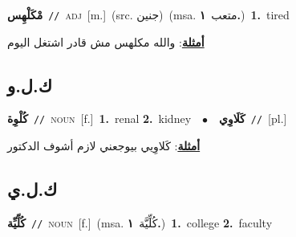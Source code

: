 \documentclass[10pt,a4paper,twoside]{article} %
\begin{document}
\begin{multicols}{2}
{\setlength\topsep{0pt}\textbf{\foreignlanguage{arabic}{مْكَلْهِس}}\ {\color{gray}\texttt{//}\color{black}}\ \textsc{adj}\ [m.]\ (src. \color{gray}\foreignlanguage{arabic}{جنين}\color{black})\ \color{gray}(msa. \foreignlanguage{arabic}{متعب}~\foreignlanguage{arabic}{\textbf{١.}})\color{black}\ \textbf{1.}~tired\  \begin{flushright}\color{gray}\foreignlanguage{arabic}{\textbf{\underline{\foreignlanguage{arabic}{أمثلة}}}: والله مكلهس مش قادر اشتغل اليوم}\end{flushright}\color{black}} \vspace{2mm}

\vspace{-3mm}
\subsection*{\color{blue}\foreignlanguage{arabic}{ك.ل.و}\color{blue}{}} 

{\setlength\topsep{0pt}\textbf{\foreignlanguage{arabic}{كُلْوِة}}\ {\color{gray}\texttt{//}\color{black}}\ \textsc{noun}\ [f.]\ \textbf{1.}~renal  \textbf{2.}~kidney\ \ $\bullet$\ \ \setlength\topsep{0pt}\textbf{\foreignlanguage{arabic}{كَلَاوِي}}\ {\color{gray}\texttt{//}\color{black}}\ [pl.]\  \begin{flushright}\color{gray}\foreignlanguage{arabic}{\textbf{\underline{\foreignlanguage{arabic}{أمثلة}}}: كَلاوِيي بيوجعني لازم أشوف الدكتور}\end{flushright}\color{black}} \vspace{2mm}

\vspace{-3mm}
\subsection*{\color{blue}\foreignlanguage{arabic}{ك.ل.ي}\color{blue}{}} 

{\setlength\topsep{0pt}\textbf{\foreignlanguage{arabic}{كُلِّيِّة}}\ {\color{gray}\texttt{//}\color{black}}\ \textsc{noun}\ [f.]\ \color{gray}(msa. \foreignlanguage{arabic}{كُلِّيَّة}~\foreignlanguage{arabic}{\textbf{١.}})\color{black}\ \textbf{1.}~college  \textbf{2.}~faculty\ } \vspace{2mm}


\end{multicols}
\end{document}
